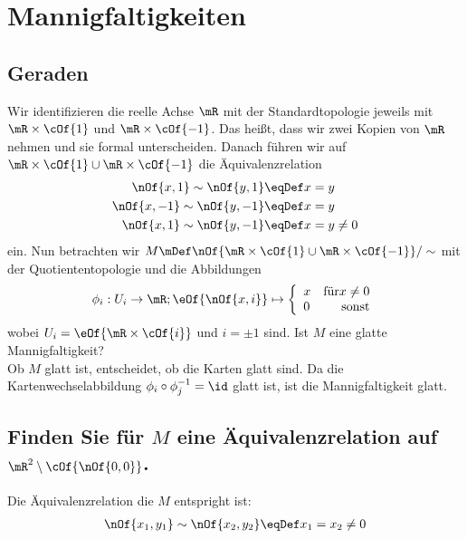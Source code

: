 \section{Mannigfaltigkeiten}
\subsection{Geraden}
Wir identifizieren die reelle Achse $\mR$ mit der Standardtopologie jeweils mit $\mR\times\cOf{1}$ und $\mR\times\cOf{-1}$. Das heißt, dass wir zwei Kopien von $\mR$ nehmen und sie formal unterscheiden. Danach führen wir auf $\mR\times\cOf{1}\cup\mR\times\cOf{-1}$ die Äquivalenzrelation
\begin{align}
	\nOf{x,1}\sim\nOf{y,1}&\eqDef x = y \\
	\nOf{x,-1}\sim\nOf{y,-1}&\eqDef x = y \\
	\nOf{x,1}\sim\nOf{y,-1}&\eqDef x = y \neq 0
\end{align}
ein. Nun betrachten wir $M\mDef\nOf{\mR\times\cOf{1}\cup\mR\times\cOf{-1}}/\sim$ mit der Quotiententopologie und die Abbildungen
\begin{equation}
	\phi_i : U_i \to \mR; \eOf{\nOf{x,i}} \mapsto \left\{\begin{array}{l r}x & \text{für} x \neq 0\\0&\text{sonst}\end{array}\right.
\end{equation}
wobei $U_i = \eOf{\mR\times\cOf{i}}$ und $i = \pm 1$ sind. Ist $M$ eine glatte Mannigfaltigkeit?\\
Ob $M$ glatt ist, entscheidet, ob die Karten glatt sind. Da die Kartenwechselabbildung $\phi_i\circ\phi_j^{-1} = \id$ glatt ist, ist die Mannigfaltigkeit glatt.

\subsection{Finden Sie für $M$ eine Äquivalenzrelation auf $\mR^2\setminus\cOf{\nOf{0,0}}$.} Die Äquivalenzrelation die $M$ entspright ist:
\begin{align}
	\nOf{x_1,y_1}\sim\nOf{x_2,y_2}&\eqDef x_1 = x_2 \neq 0\\
\end{align}


